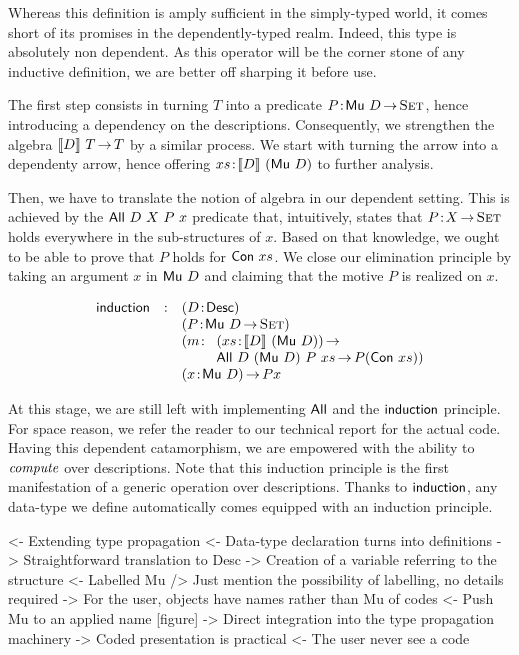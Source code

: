 Whereas this definition is amply sufficient in the simply-typed world,
it comes short of its promises in the dependently-typed realm. Indeed,
this type is absolutely non dependent. As this operator will be the
corner stone of any inductive definition, we are better off sharping
it before use.

The first step consists in turning $T$ into a predicate
$\Bhab{P}{\Mu{D} \To \Set}$, hence introducing a dependency on the
descriptions. Consequently, we strengthen the algebra $\descop{D}{T}
\To T$ by a similar process. We start with turning the arrow into a
dependenty arrow, hence offering $\Bhab{xs}{\descop{D}{(\Mu{D})}}$ to
further analysis. 

Then, we have to translate the notion of algebra in our dependent
setting. This is achieved by the $\All{D}{X}{P}{x}$ predicate that,
intuitively, states that $\Bhab{P}{X \To \Set}$ holds everywhere in
the sub-structures of $x$. Based on that knowledge, we ought to be
able to prove that $P$ holds for $\Con{xs}$. We close our elimination
principle by taking an argument $x$ in $\Mu{D}$ and claiming that the
motive $P$ is realized on $x$.

\[
\begin{array}{lcll}
\F{induction} & : & \multicolumn{2}{l}{\PITEL{D}{\Desc}}                   \\
              &   & \multicolumn{2}{l}{\PITEL{P}{\Mu{D} \To \Set}}         \\
              &   & \PITEL{m}{& \PI{xs}{\descop{D}{(\Mu{D})}}              \\
              &   &           & \All{D}{(\Mu{D})}{P}{xs} \To P (\Con{xs})} \\
              &   & \multicolumn{2}{l}{\PI{x}{\Mu{D}} P x}
\end{array}
\]

At this stage, we are still left with implementing $\F{All}$ and the
$\F{induction}$ principle. For space reason, we refer the reader to
our technical report for the actual code. Having this dependent
catamorphism, we are empowered with the ability to $\emph{compute}$
over descriptions. Note that this induction principle is the first
manifestation of a generic operation over descriptions. Thanks to
$\F{induction}$, any data-type we define automatically comes equipped
with an induction principle.


\begin{wstructure}
<- Extending type propagation
    <- Data-type declaration turns into definitions
        -> Straightforward translation to Desc
        -> Creation of a variable referring to the structure
    <- Labelled Mu
        /> Just mention the possibility of labelling, no details required
        -> For the user, objects have names rather than Mu of codes
    <- Push Mu to an applied name [figure]
        -> Direct integration into the type propagation machinery
    -> Coded presentation is practical
        <- The user never see a code
\end{wstructure}


